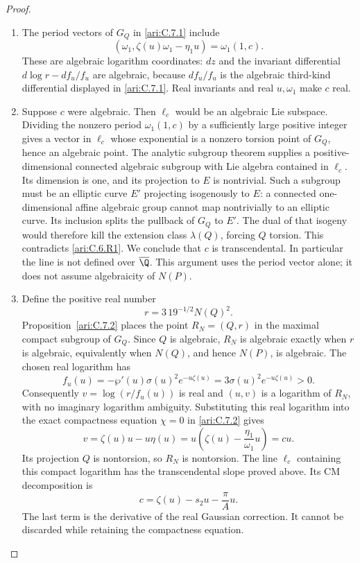 \begin{proof}
\begin{enumerate}[label=\arabic*.,leftmargin=*]
\item The period vectors of $G_Q$ in \ref{ari:C.7.1} include
\[
 (\omega_1,\zeta(u)\omega_1-\eta_1u)
       =\omega_1(1,c).
\]
These are algebraic logarithm coordinates: $dz$ and the
invariant differential $d\log r-df_u/f_u$ are algebraic,
because $df_u/f_u$ is the algebraic third-kind differential
displayed in \ref{ari:C.7.1}. Real invariants and real $u,\omega_1$
make $c$ real.

\item Suppose $c$ were algebraic. Then $\ell_c$ would be an
algebraic Lie subspace. Dividing the nonzero period
$\omega_1(1,c)$ by a sufficiently large positive integer
gives a vector in $\ell_c$ whose exponential is a nonzero
torsion point of $G_Q$, hence an algebraic point. The
analytic subgroup theorem
\citep[Theorem~6.1, arXiv v8, p.~43]{huber2022} supplies a positive-dimensional
connected algebraic subgroup with Lie algebra contained in
$\ell_c$. Its dimension is one, and its projection to $E$
is nontrivial. Such a subgroup must be an elliptic curve
$E'$ projecting isogenously to $E$: a connected
one-dimensional affine algebraic group cannot map
nontrivially to an elliptic curve. Its inclusion splits the
pullback of $G_Q$ to $E'$. The dual of that isogeny would
therefore kill the extension class $\lambda(Q)$, forcing
$Q$ torsion. This contradicts \ref{ari:C.6.R1}. We conclude that $c$
is transcendental. In particular the line is not defined over
$\overline\Q$. This argument uses the period vector alone;
it does not assume algebraicity of $N(P)$.

\item Define the positive real number
\[
 r=3\,19^{-1/2}N(Q)^2.
\]
Proposition~\ref{ari:C.7.2} places the point $R_N=(Q,r)$
in the maximal compact subgroup of $G_Q$. Since $Q$ is algebraic,
$R_N$ is algebraic exactly when $r$ is algebraic, equivalently
when $N(Q)$, and hence $N(P)$, is algebraic. The chosen real
logarithm has
\[
 f_u(u)=-\wp'(u)\sigma(u)^2e^{-u\zeta(u)}
        =3\sigma(u)^2e^{-u\zeta(u)}>0.
\]
Consequently $v=\log(r/f_u(u))$ is real and
$(u,v)$ is a logarithm of $R_N$, with no imaginary logarithm
ambiguity. Substituting this real logarithm into the exact
compactness equation $\chi=0$ in \ref{ari:C.7.2} gives
\[
 v=\zeta(u)u-u\eta(u)
   =u\left(\zeta(u)-\frac{\eta_1}{\omega_1}u\right)=cu.
\]
Its projection $Q$ is nontorsion, so $R_N$ is nontorsion.
The line $\ell_c$ containing this compact logarithm has the
transcendental slope proved above. Its CM decomposition is
\[
 c=\zeta(u)-s_2u-\frac{\pi}{A}u.
\]
The last term is the derivative of the real Gaussian
correction. It cannot be discarded while retaining the
compactness equation.
\end{enumerate}
\end{proof}